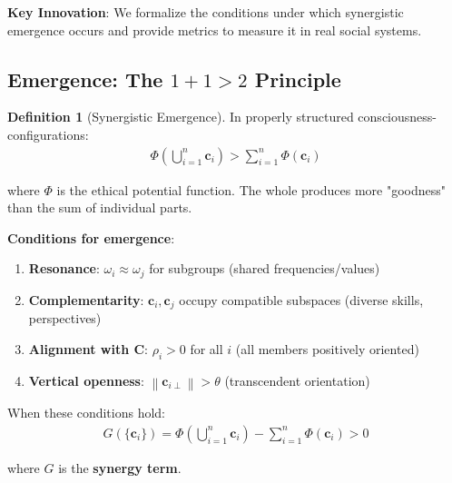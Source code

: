 \documentclass[11pt,a4paper]{article}
\theoremstyle{definition}
\newtheorem{definition}{Definition}[section]
\theoremstyle{remark}
\newcommand{\cc}{\mathbf{c}}
\newcommand{\norm}[1]{\left\|#1\right\|}
\begin{document}
\begin{small}
\begin{enumerate}
\begin{mdframed}[backgroundcolor=cyan!5,linewidth=2pt]
\textbf{Key Innovation}: We formalize the conditions under which synergistic emergence occurs and provide metrics to measure it in real social systems.
\end{mdframed}

\subsection{Emergence: The \(1+1 > 2\) Principle}

\begin{definition}[Synergistic Emergence]
In properly structured consciousness-configurations:
\begin{align}
\Phi\left(\bigcup_{i=1}^n \cc_i\right) > \sum_{i=1}^n \Phi(\cc_i)
\end{align}

where \(\Phi\) is the ethical potential function. The whole produces more "goodness" than the sum of individual parts.

\textbf{Conditions for emergence}:
\begin{enumerate}
    \item \textbf{Resonance}: \(\omega_i \approx \omega_j\) for subgroups (shared frequencies/values)
    \item \textbf{Complementarity}: \(\cc_i, \cc_j\) occupy compatible subspaces (diverse skills, perspectives)
    \item \textbf{Alignment with \(\mathbf{C}\)}: \(\rho_i > 0\) for all \(i\) (all members positively oriented)
    \item \textbf{Vertical openness}: \(\norm{\cc_{i\perp}} > \theta\) (transcendent orientation)
\end{enumerate}

When these conditions hold:
\begin{align}
G(\{\cc_i\}) = \Phi\left(\bigcup_{i=1}^n \cc_i\right) - \sum_{i=1}^n \Phi(\cc_i) > 0
\end{align}

where \(G\) is the \textbf{synergy term}.
\end{definition}

\begin{figure}[H]
\centering
{}
\end{figure}
\end{enumerate}
\end{small}
\end{document}
